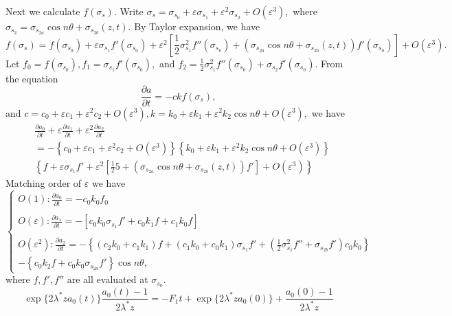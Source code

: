 \documentclass[12pt]{article}
\renewcommand{\(}{\left (}
\renewcommand{\)}{\right )}
\begin{document}
Next we calculate $f(\sigma_s).$ Write $\sigma_s = \sigma_{s_0} + \varepsilon \sigma_{s_1} + \varepsilon^2 \sigma_{s_2} + O(\varepsilon^3),$ where $\sigma_{s_2} = \sigma_{s_{2a}} \cos n \theta+\sigma_{s_{2 b}}(z,t).$
By Taylor expansion, we have
\begin{equation}
    f(\sigma_s) = f(\sigma_{s_0}) + \varepsilon \sigma_{s_1} f'(\sigma_{s_0}) + \varepsilon^2 \left[ \frac{1}{2} \sigma^2_{s_1} f''(\sigma_{s_0}) + \left(\sigma_{s_{2a}} \cos n \theta+\sigma_{s_{2 b}}(z,t)\right)f'(\sigma_{s_0})\right] + O(\varepsilon^3).
\end{equation}
Let $f_0= f(\sigma_{s_0}), f_1 = \sigma_{s_1} f'(\sigma_{s_0}),$ and $f_2 = \frac{1}{2} \sigma^2_{s_1} f''(\sigma_{s_0}) + \sigma_{s_2}f'(\sigma_{s_0}).$
From the equation \begin{equation}
    \frac{\partial a}{\partial t} = -ckf(\sigma_s),
\end{equation}
and $c = c_0 + \varepsilon c_1 + \varepsilon^2 c_2 + O(\varepsilon^3), k = k_0 + \varepsilon k_1 + \varepsilon^2 k_2 \cos n \theta + O(\varepsilon^3),$
we have \begin{align}
    &\frac{\partial a_0}{\partial t} + \varepsilon \frac{\partial a_1}{\partial t} + \varepsilon^2 \frac{\partial a_2}{\partial t} \\
    &= -\left\{c_0 + \varepsilon c_1 + \varepsilon^2 c_2 + O(\varepsilon^3)\right\}  \left\{k_0 + \varepsilon k_1 + \varepsilon^2 k_2 \cos n \theta + O(\varepsilon^3)\right\}  \\
    &\left\{f + \varepsilon \sigma_{s_1} f' + \varepsilon^2 \left[ \frac{1}{2} 5 + \left(\sigma_{s_{2a}} \cos n \theta+\sigma_{s_{2 b}}(z,t)\right)f'\right] + O(\varepsilon^3)\right\}
\end{align}
Matching order of $\varepsilon$ we have
\begin{equation}
    \begin{cases}
    O(1): \frac{\partial a_0}{\partial t} = -c_0 k_0 f_0\\
    \\
    O(\varepsilon): \frac{\partial a_1}{\partial t} = -[c_0 k_0 \sigma_{s_1} f' + c_0 k_1 f + c_1 k_0 f]\\
    \\
    O(\varepsilon^2): \frac{\partial a_2}{\partial t} = -\left\{ (c_2 k_0 + c_1 k_1)f + (c_1 k_0+c_0 k_1) \sigma_{s_1} f' + (\frac{1}{2}  \sigma^2_{s_1} f'' + \sigma_{s_{2 b}} f')c_0 k_0\right\} \\
    - \left\{ c_0 k_2 f + c_0 k_0 \sigma_{s_{2 a}}f'\right\}\cos n \theta,
    \end{cases}
\end{equation}
where $f, f', f''$ are all evaluated at $\sigma_{s_0}.$
\begin{equation}
    \exp\{2\lambda^* z a_0(t)\} \frac{a_0(t)-1}{2\lambda^* z} = -F_1 t + \exp\{2\lambda^* z a_0(0)\} + \frac{a_0(0)- 1}{2 \lambda^* z}
\end{equation}
\end{document}
